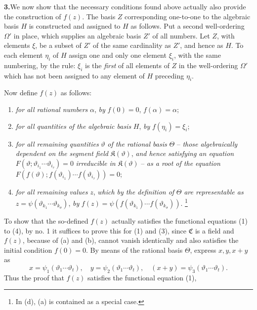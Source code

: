 \documentclass[11pt]{article}
\providecommand{\Cfield}{\mathfrak C}
\providecommand{\Kfield}{\mathfrak K}
\providecommand{\Kfield}{\mathfrak{K}}
\providecommand{\srcfn}[2]{%
  \begingroup
  \renewcommand{\thefootnote}{#1}%
  \footnote{#2}%
  \addtocounter{footnote}{-1}%
  \endgroup}
\begin{document}
\medskip
\noindent\textbf{3.}\quad We now show that the necessary conditions found above actually also provide the construction of \(f(z)\). The basis \(Z\) corresponding one-to-one to the algebraic basis \(H\) is constructed and assigned to \(H\) as follows. Put a second well-ordering \(\Omega'\) in place, which supplies an algebraic basis \(Z'\) of all numbers. Let \(Z\), with elements \(\xi\), be a subset of \(Z'\) of the same cardinality as \(Z'\), and hence as \(H\). To each element \(\eta_i\) of \(H\) assign one and only one element \(\xi_i\), with the same numbering, by the rule: \(\xi_i\) is the \emph{first} of all elements of \(Z\) in the well-ordering \(\Omega'\) which has not been assigned to any element of \(H\) preceding \(\eta_i\).

Now define \(f(z)\) as follows:
\begin{enumerate}
\item[(a)] \emph{for all rational numbers} \(\alpha\), \emph{by} \(f(0)=0\), \(f(\alpha)=\alpha\);
\item[(b)] \emph{for all quantities of the algebraic basis} \(H\), \emph{by} \(f(\eta_i)=\xi_i\);
\item[(c)] \emph{for all remaining quantities} \(\vartheta\) \emph{of the rational basis} \(\Theta\) -- \emph{those algebraically dependent on the segment field} \(\Kfield(\vartheta)\), \emph{and hence satisfying an equation} \(F(\vartheta;\vartheta_{i_1}\cdots\vartheta_{i_\tau})=0\) \emph{irreducible in} \(\Kfield(\vartheta)\) -- \emph{as a root of the equation} \(F(f(\vartheta);f(\vartheta_{i_1})\cdots f(\vartheta_{i_\tau}))=0\);
\item[(d)] \emph{for all remaining values} \(z\), \emph{which by the definition of} \(\Theta\) \emph{are representable as} \(z=\psi(\vartheta_{k_1}\cdots\vartheta_{k_\sigma})\), \emph{by} \(f(z)=\psi(f(\vartheta_{k_1})\cdots f(\vartheta_{k_\sigma}))\).\srcfn{*)}{In (d), (a) is contained as a special case.}
\end{enumerate}
To show that the so-defined \(f(z)\) actually satisfies the functional equations (1) to (4), by no. 1 it suffices to prove this for (1) and (3), since \(\Cfield\) is a field and \(f(z)\), because of (a) and (b), cannot vanish identically and also satisfies the initial condition \(f(0)=0\). By means of the rational basis \(\Theta\), express \(x,y,x+y\) as
\[
x=\psi_1(\vartheta_1\cdots\vartheta_t),\quad
 y=\psi_2(\vartheta_1\cdots\vartheta_t),\quad
 (x+y)=\psi_3(\vartheta_1\cdots\vartheta_t).
\]
Thus the proof that \(f(z)\) satisfies the functional equation (1),
\end{document}

